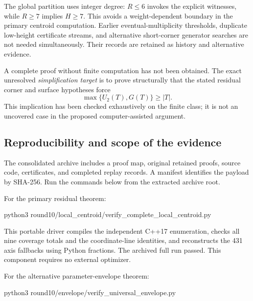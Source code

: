 \documentclass[
  11pt,
  a4paper,
]{article}
\newenvironment{Shaded}{}{}
\newcommand{\NormalTok}[1]{#1}
\begin{document}
The global partition uses integer degree: \(R\le6\) invokes the explicit
witnesses, while \(R\ge7\) implies \(H\ge7\). This avoids a
weight-dependent boundary in the primary centroid computation. Earlier
eventual-multiplicity thresholds, duplicate low-height certificate
streams, and alternative short-corner generator searches are not needed
simultaneously. Their records are retained as history and alternative
evidence.

A complete proof without finite computation has not been obtained. The
exact unresolved \emph{simplification target} is to prove structurally
that the stated residual corner and surface hypotheses force \[
\max\{U_2(T),G(T)\}\ge|T|.
\] This implication has been checked exhaustively on the finite class;
it is not an uncovered case in the proposed computer-assisted argument.

\hypertarget{reproducibility-and-scope-of-the-evidence}{%
\subsection{Reproducibility and scope of the
evidence}\label{reproducibility-and-scope-of-the-evidence}}

The consolidated archive includes a proof map, original retained proofs,
source code, certificates, and completed replay records. A manifest
identifies the payload by SHA-256. Run the commands below from the
extracted archive root.

For the primary residual theorem:

\begin{Shaded}
\begin{Highlighting}[]
\NormalTok{python3 round10/local\_centroid/verify\_complete\_local\_centroid.py}
\end{Highlighting}
\end{Shaded}

This portable driver compiles the independent C++17 enumeration, checks
all nine coverage totals and the coordinate-line identities, and
reconstructs the 431 axis fallbacks using Python fractions. The archived
full run passed. This component requires no external optimizer.

For the alternative parameter-envelope theorem:

\begin{Shaded}
\begin{Highlighting}[]
\NormalTok{python3 round10/envelope/verify\_universal\_envelope.py}
\end{Highlighting}
\end{Shaded}
\end{document}
